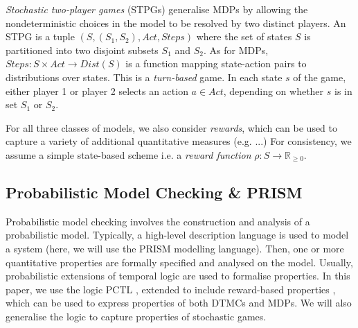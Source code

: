 \documentclass{llncs}
\def\Rsetgeq{\mathbb{R}_{\geq 0}}
\newcommand{\dave}[1]{{\color{red}{[D: \sf #1]}}}
\begin{document}
\emph{Stochastic two-player games} (STPGs) generalise MDPs by allowing the nondeterministic choices
in the model to be resolved by two distinct players.
An STPG is a tuple $(S,(S_1,S_2),Act,Steps)$
where the set of states $S$ is partitioned into two disjoint subsets $S_1$ and $S_2$.
As for MDPs, $Steps:S\times Act\rightarrow Dist(S)$ is a function mapping
state-action pairs to distributions over states.
This is a \emph{turn-based} game. In each state $s$ of the game,
either player 1 or player 2 selects an action $a\in Act$,
depending on whether $s$ is in set $S_1$ or $S_2$.

For all three classes of models, we also consider \emph{rewards},
which can be used to capture a variety of additional quantitative measures
(e.g. ...)
For consistency, we assume a simple state-based scheme
i.e. a \emph{reward function} $\rho:S\rightarrow\Rsetgeq$.
\dave{might move rewards to next sect}


\subsection{Probabilistic Model Checking \& PRISM}

Probabilistic model checking involves the construction and analysis of a probabilistic model.
Typically, a high-level description language is used to model a system
(here, we will use the PRISM \cite{KNP11} modelling language).
Then, one or more quantitative properties are formally specified and analysed on the model.
Usually, probabilistic extensions of temporal logic are used to formalise properties.
In this paper, we use the logic PCTL \cite{HJ94},
extended to include reward-based properties \cite{KNP07a},
which can be used to express properties of both DTMCs and MDPs.
We will also generalise the logic to capture properties of stochastic games.
\end{document}

